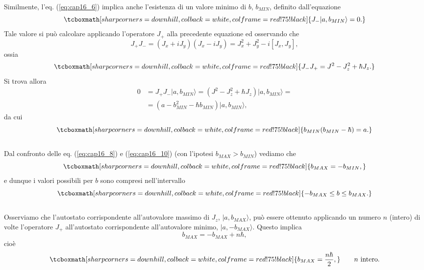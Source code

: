 \documentclass[a4paper,12pt,oneside]{book}
\begin{document}
Similmente, l'eq. (\ref{eq:cap16_6}) implica anche l'esistenza di un valore minimo di $b$,  $b_{MIN}$, definito dall'equazione
	\begin{equation}
		\tcboxmath[sharp corners=downhill, colback=white, colframe=red!75!black]{
			J_{-} \vert a, b_{MIN} \rangle =0.
			}
	\end{equation}
Tale valore si può calcolare applicando l'operatore $J_+$ alla precedente equazione ed osservando che
	\begin{equation}
		J_+J_- = (J_x+iJ_y)(J_x-iJ_y)= J_x^2 +J_y ^2-i[J_x, J_y] ,
	\end{equation}
ossia
	\begin{equation}
		\tcboxmath[sharp corners=downhill, colback=white, colframe=red!75!black]{
			J_-J_+ = J^2 -J_z ^2 +\hbar J_z .
			}
	\label{eq:cap16_9}
	\end{equation}
Si trova allora
	\begin{align}
		0&=J_{+}J_{-} \vert a, b_{MIN} \rangle = (J^2 -J_z ^2 +\hbar J_z)\vert a, b_{MIN} \rangle = \nonumber \\
		&=(a- b_{MIN} ^2 - \hbar b_{MIN} )\vert a, b_{MIN} \rangle ,
	\end{align}
da cui
	\begin{equation}
		\tcboxmath[sharp corners=downhill, colback=white, colframe=red!75!black]{
			b_{MIN}(b_{MIN}-\hbar) =a .
			}
	\label{eq:cap16_10}
	\end{equation}\\
	
Dal confronto delle eq. (\ref{eq:cap16_8}) e (\ref{eq:cap16_10}) (con l'ipotesi $b_{MAX} > b_{MIN}$) vediamo che
	\begin{equation}
		\tcboxmath[sharp corners=downhill, colback=white, colframe=red!75!black]{
			b_{MAX} = - b_{MIN} ,
			}
	\end{equation}
e dunque i valori possibili per $b$ sono compresi nell'intervallo
	\begin{equation}
		\tcboxmath[sharp corners=downhill, colback=white, colframe=red!75!black]{
			-b_{MAX} \leq b \leq b_{MAX} .
			}
	\end{equation}\\
	
Osserviamo che l'autostato corrispondente all'autovalore massimo di $J_z$, $\vert a, b_{MAX}\rangle$, può essere ottenuto applicando un numero $n$ (intero) di volte l'operatore $J_+$ all'autostato corrispondente all'autovalore minimo, $\vert a, - b_{MAX}\rangle $. Questo implica
	\begin{equation}
		b_{MAX}=-b_{MAX}+n\hbar, 
	\end{equation}
cioè
	\begin{equation}
		\tcboxmath[sharp corners=downhill, colback=white, colframe=red!75!black]{
			b_{MAX}=\frac{n\hbar}{2},
			} \qquad n\textrm{ intero.}
	\end{equation}\\
	
\end{document}
